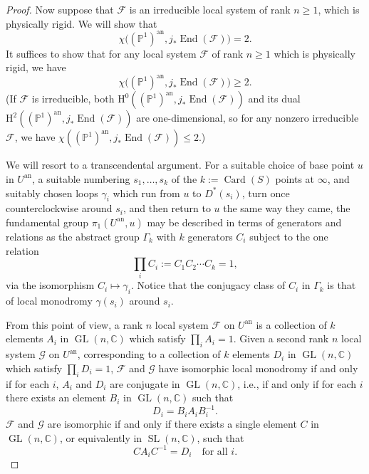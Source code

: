 \begin{proof}
Now suppose that \(\mathcal{F}\) is an irreducible local system of rank
\(n\geq 1\), which is physically rigid. We will show that
\[
  \chi\bigl((\mathbb{P}^1)^{\mathrm{an}},
    j_*\operatorname{End}(\mathcal{F})\bigr)=2.
\]
It suffices to show that for any local system \(\mathcal{F}\) of rank
\(n\geq 1\) which is physically rigid, we have
\[
  \chi\bigl((\mathbb{P}^1)^{\mathrm{an}},
    j_*\operatorname{End}(\mathcal{F})\bigr)\geq 2.
\]
(If \(\mathcal{F}\) is irreducible, both
\(\mathrm{H}^0((\mathbb{P}^1)^{\mathrm{an}},j_*\operatorname{End}(\mathcal{F}))\)
and its dual
\(\mathrm{H}^2((\mathbb{P}^1)^{\mathrm{an}},j_*\operatorname{End}(\mathcal{F}))\)
are one-dimensional, so for any nonzero irreducible \(\mathcal{F}\), we have
\(\chi((\mathbb{P}^1)^{\mathrm{an}},j_*\operatorname{End}(\mathcal{F}))\leq 2\).)

We will resort to a transcendental argument. For a suitable choice of base point
\(u\) in \(U^{\mathrm{an}}\), a suitable numbering \(s_1,\ldots,s_k\) of the
\(k:=\operatorname{Card}(S)\) points at \(\infty\), and suitably chosen loops
\(\gamma_i\) which run from \(u\) to \(D^*(s_i)\), turn once counterclockwise
around \(s_i\), and then return to \(u\) the same way they came, the fundamental
group \(\pi_1(U^{\mathrm{an}},u)\) may be described in terms of generators and
relations as the abstract group \(\Gamma_k\) with \(k\) generators \(C_i\)
subject to the one relation
\[
  \prod_i C_i := C_1C_2\cdots C_k=1,
\]
via the isomorphism \(C_i\mapsto\gamma_i\). Notice that the conjugacy class of
\(C_i\) in \(\Gamma_k\) is that of local monodromy \(\gamma(s_i)\) around
\(s_i\).

From this point of view, a rank \(n\) local system \(\mathcal{F}\) on
\(U^{\mathrm{an}}\) is a collection of \(k\) elements \(A_i\) in
\(\operatorname{GL}(n,\mathbb{C})\) which satisfy \(\prod_i A_i=1\). Given a
second rank \(n\) local system \(\mathcal{G}\) on \(U^{\mathrm{an}}\),
corresponding to a collection of \(k\) elements \(D_i\) in
\(\operatorname{GL}(n,\mathbb{C})\) which satisfy \(\prod_i D_i=1\),
\(\mathcal{F}\) and \(\mathcal{G}\) have isomorphic local monodromy if and only
if for each \(i\), \(A_i\) and \(D_i\) are conjugate in
\(\operatorname{GL}(n,\mathbb{C})\), i.e., if and only if for each \(i\) there
exists an element \(B_i\) in \(\operatorname{GL}(n,\mathbb{C})\) such that
\[
  D_i=B_iA_iB_i^{-1}.
\]
\(\mathcal{F}\) and \(\mathcal{G}\) are isomorphic if and only if there exists a
single element \(C\) in \(\operatorname{GL}(n,\mathbb{C})\), or equivalently in
\(\operatorname{SL}(n,\mathbb{C})\), such that
\[
  CA_iC^{-1}=D_i\quad\text{for all }i.
\]


\end{proof}
